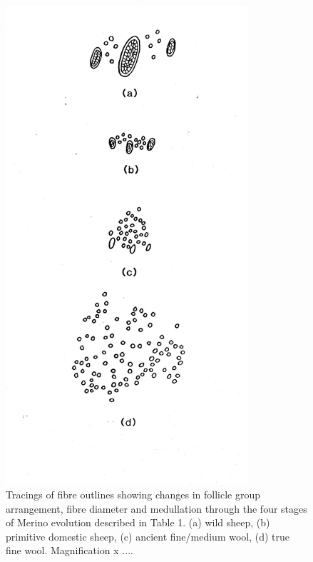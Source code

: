 %

\begin{figure}[h]
  \centering
  \includegraphics[width=0.8\textwidth, trim = 0 90 0 130]{images/fig7.png}
  \caption{ Tracings of fibre outlines showing changes in follicle group
    arrangement, fibre diameter and medullation through the four
    stages of Merino evolution described in Table 1.  (a) wild sheep,
    (b) primitive domestic sheep, (c) ancient fine/medium wool,
    (d) true fine wool.  Magnification x ....}
  \label{fig:7}
\end{figure}

%
